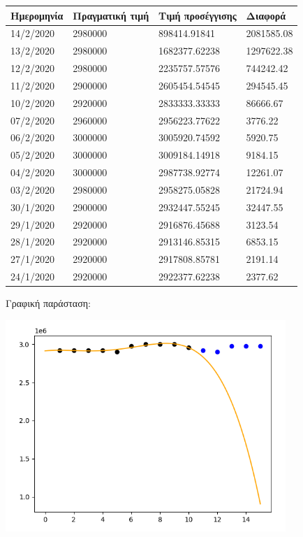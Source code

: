 \documentclass[a4paper,11pt]{article}
\begin{document}
	\begin{tabular}{| l | l | l | l |}
		\hline
		Ημερομηνία & Πραγματική τιμή & Τιμή προσέγγισης & Διαφορά
		\\ \hline
		14/2/2020 & 2980000 & 898414.91841 & 2081585.08
		\\ \hline
		13/2/2020 & 2980000 & 1682377.62238 & 1297622.38
		\\ \hline
		12/2/2020 & 2980000 & 2235757.57576 & 744242.42
		\\ \hline
		11/2/2020 & 2900000 & 2605454.54545 & 294545.45
		\\ \hline
		10/2/2020 & 2920000 & 2833333.33333 & 86666.67
		\\ \hline
		07/2/2020 & 2960000 & 2956223.77622 & 3776.22
		\\ \hline
		06/2/2020 & 3000000 & 3005920.74592 & 5920.75
		\\ \hline
		05/2/2020 & 3000000 & 3009184.14918 & 9184.15
		\\ \hline
		04/2/2020 & 3000000 & 2987738.92774 & 12261.07
		\\ \hline
		03/2/2020 & 2980000 & 2958275.05828 & 21724.94
		\\ \hline
		30/1/2020 & 2900000 & 2932447.55245 & 32447.55
		\\ \hline
		29/1/2020 & 2920000 & 2916876.45688 & 3123.54
		\\ \hline
		28/1/2020 & 2920000 & 2913146.85315 & 6853.15
		\\ \hline
		27/1/2020 & 2920000 & 2917808.85781 & 2191.14
		\\ \hline
		24/1/2020 & 2920000 & 2922377.62238 & 2377.62
		\\ \hline
		
	\end{tabular}

	\hfill \break
	
	Γραφική παράσταση:
	
	\includegraphics[height=8cm]{karel-4-alt.png}
	
\end{document}
